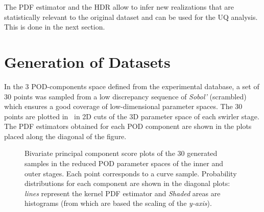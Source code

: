 The PDF estimator and the HDR allow to infer new realizations that are statistically relevant to the original dataset and can be used for the UQ analysis. This is done in the next section. 

\section{Generation of Datasets }\label{sec:res}

In the 3 POD-components space defined from the experimental database, a set of 30 points was sampled from a low discrepancy sequence of \emph{Sobol'} (scrambled)~\cite{Cavazzuti2013,Kucherenko2015} which ensures a good coverage of low-dimensional parameter spaces. The 30 points are plotted in ~in 2D cuts of the 3D parameter space of each swirler stage. The PDF estimators obtained for each POD component are shown in the plots placed along the diagonal of the figure.  

\begin{figure}[!h]
\centering
{}
\caption{Bivariate principal component score plots of the 30 generated samples in the reduced POD parameter spaces of the inner and outer stages. Each point corresponds to a curve sample. Probability distributions for each component are shown in the diagonal plots: \emph{lines} represent the kernel PDF estimator and \emph{Shaded} areas are histograms (from which are based the scaling of the \emph{y-axis}).}
\label{fig:samples-scatter}
\end{figure}

